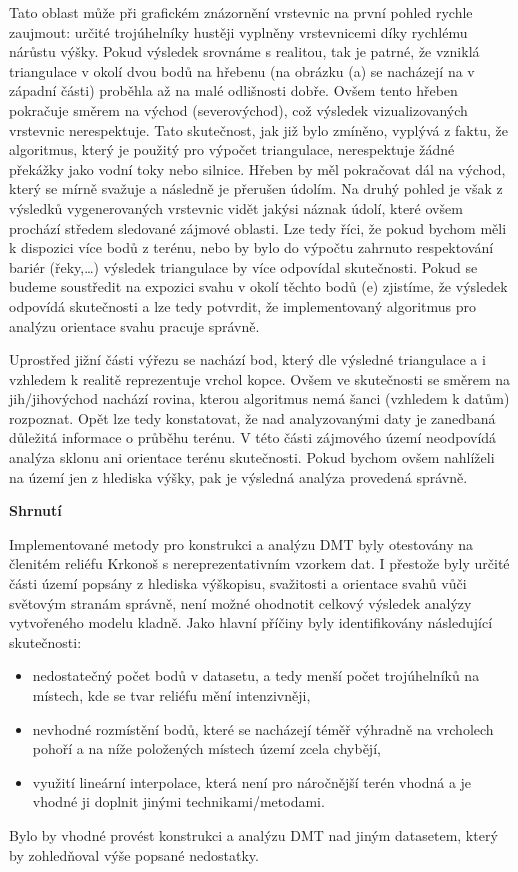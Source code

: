 \par Tato oblast může při grafickém znázornění vrstevnic na první pohled rychle zaujmout: určité trojúhelníky hustěji vyplněny vrstevnicemi díky rychlému nárůstu výšky. Pokud výsledek srovnáme s realitou, tak je patrné, že vzniklá triangulace v okolí dvou bodů na hřebenu (na obrázku (a) se nacházejí na v západní části) proběhla až na malé odlišnosti dobře. Ovšem tento hřeben pokračuje směrem na východ (severovýchod), což výsledek vizualizovaných vrstevnic nerespektuje. Tato skutečnost, jak již bylo zmíněno, vyplývá z faktu, že algoritmus, který je použitý pro výpočet triangulace, nerespektuje žádné překážky jako vodní toky nebo silnice. Hřeben by měl pokračovat dál na východ, který se mírně svažuje a následně je přerušen údolím. Na druhý pohled je však z výsledků vygenerovaných vrstevnic vidět jakýsi náznak údolí, které ovšem prochází středem sledované zájmové oblasti. Lze tedy říci, že pokud bychom měli k dispozici více bodů z terénu, nebo by bylo do výpočtu zahrnuto respektování bariér (řeky,\dots) výsledek triangulace by více odpovídal skutečnosti. Pokud se budeme soustředit na expozici svahu v okolí těchto bodů (e) zjistíme, že výsledek odpovídá skutečnosti a lze tedy potvrdit, že implementovaný algoritmus pro analýzu orientace svahu pracuje správně.
\par Uprostřed jižní části výřezu se nachází bod, který dle výsledné triangulace a i vzhledem k realitě reprezentuje vrchol kopce. Ovšem ve skutečnosti se směrem na jih/jihovýchod nachází rovina, kterou algoritmus nemá šanci (vzhledem k datům) rozpoznat. Opět lze tedy konstatovat, že nad analyzovanými daty je zanedbaná důležitá informace o průběhu terénu. V této části zájmového území neodpovídá analýza sklonu ani orientace terénu skutečnosti. Pokud bychom ovšem nahlíželi na území jen z hlediska výšky, pak je výsledná analýza provedená správně.

\bigbreak
\par {\large\textbf{Shrnutí} }
\par Implementované metody pro konstrukci a analýzu DMT byly otestovány na členitém reliéfu Krkonoš s nereprezentativním vzorkem dat. I přestože byly určité části území popsány z hlediska výškopisu, svažitosti a orientace svahů vůči světovým stranám správně, není možné ohodnotit celkový výsledek analýzy vytvořeného modelu kladně. Jako hlavní příčiny byly identifikovány následující skutečnosti:
\begin{itemize}
    \item nedostatečný počet bodů v datasetu, a tedy menší počet trojúhelníků na místech, kde se tvar reliéfu mění intenzivněji,
    \item nevhodné rozmístění bodů, které se nacházejí téměř výhradně na vrcholech pohoří a na níže položených místech území zcela chybějí,
    \item využití lineární interpolace, která není pro náročnější terén vhodná a je vhodné ji doplnit jinými technikami/metodami.
\end{itemize}

\par Bylo by vhodné provést konstrukci a analýzu DMT nad jiným datasetem, který by zohledňoval výše popsané nedostatky.

